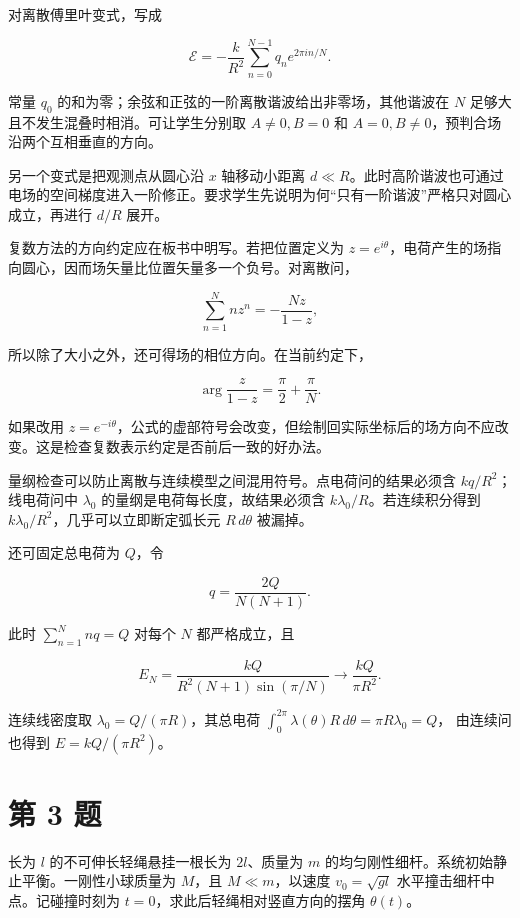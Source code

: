 \documentclass[12pt,a4paper,UTF8]{ctexart}
\begin{document}
对离散傅里叶变式，写成

\[
\mathcal E=-\frac{k}{R^2}
\sum_{n=0}^{N-1}q_n e^{2\pi in/N}.
\]

常量 \(q_0\) 的和为零；余弦和正弦的一阶离散谐波给出非零场，其他谐波在
\(N\) 足够大且不发生混叠时相消。可让学生分别取 \(A\ne0,B=0\) 和
\(A=0,B\ne0\)，预判合场沿两个互相垂直的方向。

另一个变式是把观测点从圆心沿 \(x\) 轴移动小距离
\(d\ll R\)。此时高阶谐波也可通过电场的空间梯度进入一阶修正。要求学生先说明为何``只有一阶谐波''严格只对圆心成立，再进行
\(d/R\) 展开。

复数方法的方向约定应在板书中明写。若把位置定义为
\(z=e^{i\theta}\)，电荷产生的场指向圆心，因而场矢量比位置矢量多一个负号。对离散问，

\[
\sum_{n=1}^{N}nz^n=-\frac{Nz}{1-z},
\]

所以除了大小之外，还可得场的相位方向。在当前约定下，

\[
\arg\frac{z}{1-z}
=\frac{\pi}{2}+\frac{\pi}{N}.
\]

如果改用
\(z=e^{-i\theta}\)，公式的虚部符号会改变，但绘制回实际坐标后的场方向不应改变。这是检查复数表示约定是否前后一致的好办法。

量纲检查可以防止离散与连续模型之间混用符号。点电荷问的结果必须含
\(kq/R^2\)；线电荷问中 \(\lambda_0\) 的量纲是电荷每长度，故结果必须含
\(k\lambda_0/R\)。若连续积分得到
\(k\lambda_0/R^2\)，几乎可以立即断定弧长元 \(R\,d\theta\) 被漏掉。

还可固定总电荷为 \(Q\)，令

\[
q=\frac{2Q}{N(N+1)}.
\]

此时 \(\sum_{n=1}^N nq=Q\) 对每个 \(N\) 都严格成立，且

\[
E_N=\frac{kQ}{R^2(N+1)\sin(\pi/N)}
\longrightarrow\frac{kQ}{\pi R^2}.
\]

连续线密度取 \(\lambda_0=Q/(\pi R)\)，其总电荷
\(\int_0^{2\pi}\lambda(\theta)R\,d\theta=\pi R\lambda_0=Q\)，
由连续问也得到 \(E=kQ/(\pi R^2)\)。

\newpage

\section{第 3 题}\label{ux7b2c-3-ux9898}

长为 \(l\) 的不可伸长轻绳悬挂一根长为 \(2l\)、质量为 \(m\)
的均匀刚性细杆。系统初始静止平衡。一刚性小球质量为 \(M\)，且
\(M\ll m\)，以速度 \(v_0=\sqrt{gl}\) 水平撞击细杆中点。记碰撞时刻为
\(t=0\)，求此后轻绳相对竖直方向的摆角 \(\theta(t)\)。
\end{document}
